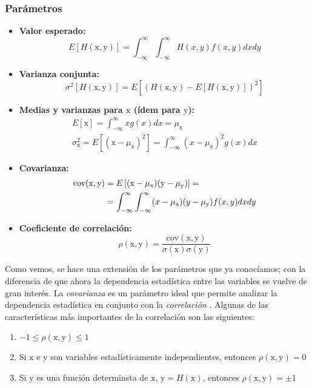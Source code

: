 \documentclass[openany]{book}
\begin{document}
\subsubsection*{Parámetros}
\begin{itemize}
  \item \textbf{Valor esperado:} $$E\left[H(\mathrm{x,y})\right]=\int_{-\infty}^{\infty}\int_{-\infty}^{\infty}H(x,y)f(x,y)dxdy$$
  \item \textbf{Varianza conjunta:} $$\sigma^2\left[H(\mathrm{x,y})\right]=E\left[\left(H(\mathrm{x,y})-E\left[H(\mathrm{x,y})\right]\right)^2\right]$$
  \item \textbf{Medias y varianzas para $\mathrm{x}$ (ídem para $\mathrm{y}$):} \begin{gather*}
      E\left[\mathrm{x}\right]=\int_{-\infty}^{\infty}xg(x)dx=\mu_{\mathrm{x}}\\ 
      \sigma^2_{\mathrm{x}}=E\left[(\mathrm{x}-\mu_{\mathrm{x}})^2\right]=\int_{-\infty}^{\infty}(x-\mu_\mathrm{x})^2g(x)dx
    \end{gather*}
  \item \textbf{Covarianza:} \begin{align}
      \label{eq:covarianza}
      \mathrm{cov(x,y)}&=E\left[(\mathrm{x}-\mu_\mathrm{x})(\mathrm{y}-\mu_\mathrm{y})\right]=\notag \\
      &=\int_{-\infty}^{\infty}\int_{-\infty}^{\infty}(x-\mu_\mathrm{x})(y-\mu_\mathrm{y})f(x,y)dxdy
    \end{align}
  \item \textbf{Coeficiente de correlación:} \begin{equation}
    \label{eq:correlacion}
    \rho(\mathrm{x,y})=\frac{\mathrm{cov(x,y)}}{\sigma(\mathrm{x})\sigma(\mathrm{y})}
  \end{equation}
\end{itemize}

\par Como vemos, se hace una extensión de los parámetros que ya conocíamos; con la diferencia de que ahora la dependencia estadística entre las variables se vuelve de gran interés. La \emph{covarianza}  es un parámetro ideal que permite analizar la dependencia estadística en conjunto con la \emph{correlación} . Algunas de las características más importantes de la correlación son las siguientes:

\begin{enumerate}
  \item $-1\leq\rho(\mathrm{x,y})\leq1$
  \item Si $\mathrm{x}$ e $\mathrm{y}$ son variables estadísticamente independientes, entonces $\rho(\mathrm{x,y})=0$
  \item Si $\mathrm{y}$ es una función determinsta de $\mathrm{x}$, $\mathrm{y}=H(\mathrm{x})$, entonces $\rho(\mathrm{x,y})=\pm1$
\end{enumerate}
\end{document}
